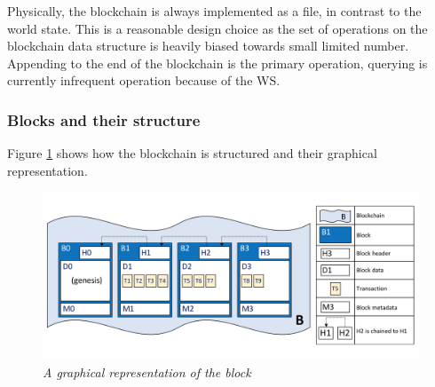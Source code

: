 \documentclass[a4paper,11pt]{report}
\begin{document}
Physically, the blockchain is always implemented as a file, in contrast to the world state. This is a reasonable design choice as the set of operations on the blockchain data structure is heavily biased towards small limited number. Appending to the end of the blockchain is the primary operation, querying is currently infrequent operation because of the WS.\cite{fabledger}

\subsubsection{Blocks and their structure}

Figure \ref{fabricBlock} shows how the blockchain is structured and their graphical representation. 

\begin{figure}[h]
\centering
  \includegraphics[width=16cm]{ledgerdiagram2.png}
  \caption{\textit{A graphical representation of the block \cite{fabledger}}}
  \label{fabricBlock}
\end{figure}
\end{document}
